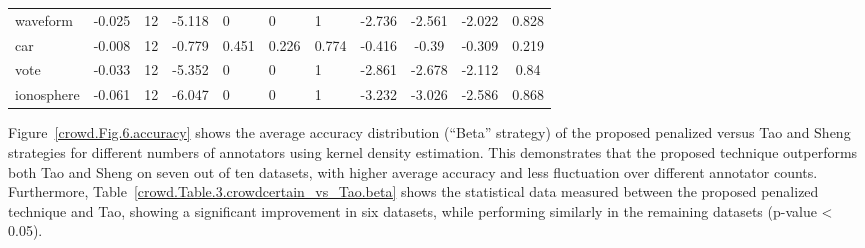 \documentclass[pdflatex,bst/sn-basic]{bst/sn-jnl}%
\begin{document}
\begin{table}[]
{\begin{tabular}{lccclllccrc}
            waveform    & -0.025 & 12 & -5.118 & 0     & 0     & 1     & -2.736 & -2.561 & -2.022 & 0.828 \\
            car         & -0.008 & 12 & -0.779 & 0.451 & 0.226 & 0.774 & -0.416 & -0.39  & -0.309 & 0.219 \\
            vote        & -0.033 & 12 & -5.352 & 0     & 0     & 1     & -2.861 & -2.678 & -2.112 & 0.84  \\
            ionosphere  & -0.061 & 12 & -6.047 & 0     & 0     & 1     & -3.232 & -3.026 & -2.586 & 0.868 \\ \hline
        \end{tabular}}
    \label{crowd.Table.2.crowdcertain_vs_Tao.freq}
\end{table}

Figure~\ref{crowd.Fig.6.accuracy} shows the average accuracy distribution (``Beta'' strategy) of the proposed penalized versus Tao and Sheng strategies for different numbers of annotators using kernel density estimation. This demonstrates that the proposed technique outperforms both Tao and Sheng on seven out of ten datasets, with higher average accuracy and less fluctuation over different annotator counts. Furthermore, Table~\ref{crowd.Table.3.crowdcertain_vs_Tao.beta} shows the statistical data measured between the proposed penalized technique and Tao, showing a significant improvement in six datasets, while performing similarly in the remaining datasets (p-value < 0.05).
\end{document}
